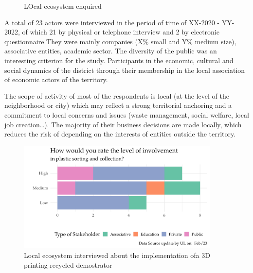\documentclass[
  11pt,
]{article}
\begin{document}
\begin{figure}
\begin{minipage}[t]{0.50\linewidth}
{{}

}

\end{minipage}%

\caption{\label{fig-ecosystem}LOcal ecosystem enquired}

\end{figure}

A total of 23 actors were interviewed in the period of time of XX-2020 -
YY-2022, of which 21 by physical or telephone interview and 2 by
electronic questionnaire They were mainly companies (X\% small and Y\%
medium size), associative entities, academic sector. The diversity of
the public was an interesting criterion for the study. Participants in
the economic, cultural and social dynamics of the district through their
membership in the local association of economic actors of the territory.

The scope of activity of most of the respondents is local (at the level
of the neighborhood or city) which may reflect a strong territorial
anchoring and a commitment to local concerns and issues (waste
management, social welfare, local job creation\ldots). The majority of
their business decisions are made locally, which reduces the risk of
depending on the interests of entities outside the territory.

\begin{figure}[H]

{\centering \includegraphics[width=0.9\textwidth,height=\textheight]{figures/fedoua/Acceptability-01.pdf}

}

\caption{\label{fig-acceptability-01}Local ecosystem interviewed about
the implementation ofa 3D printing recycled demostrator}

\end{figure}
\end{document}
